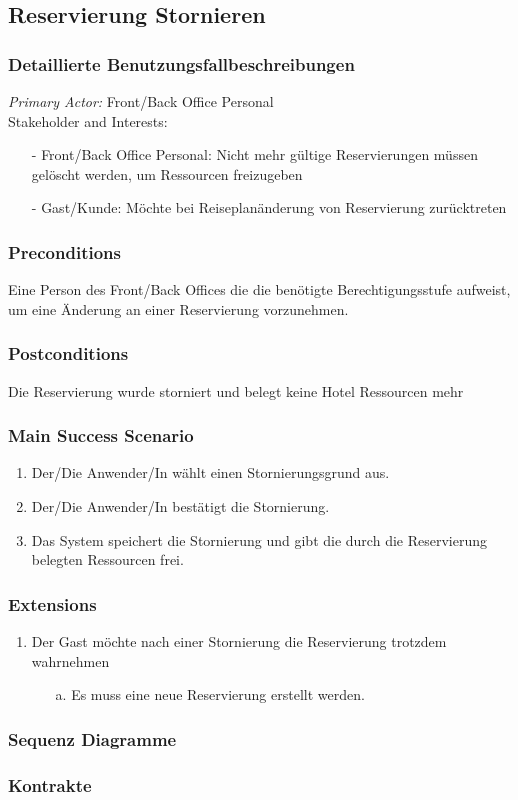 \documentclass[./detailed_overview_usecases.tex]{subfiles}
\begin{document}
    \subsection{Reservierung Stornieren}
    \subsubsection{Detaillierte Benutzungsfallbeschreibungen}
    \textit{Primary Actor:}
    Front/Back Office Personal
    \\
    Stakeholder and Interests:
    \begin{itemize}
        \item[-] Front/Back Office Personal: Nicht mehr gültige Reservierungen müssen gelöscht werden, um Ressourcen freizugeben
        \item[-] Gast/Kunde: Möchte bei Reiseplanänderung von Reservierung zurücktreten
    \end{itemize}

    \subsubsection*{Preconditions}
    Eine Person des Front/Back Offices die die benötigte Berechtigungsstufe aufweist, um eine Änderung an einer Reservierung vorzunehmen.

    \subsubsection*{Postconditions}
    Die Reservierung wurde storniert und belegt keine Hotel Ressourcen mehr

    \subsubsection*{Main Success Scenario}
    \begin{enumerate}
        \item Der/Die Anwender/In wählt einen Stornierungsgrund aus.
        \item Der/Die Anwender/In bestätigt die Stornierung.
        \item Das System speichert die Stornierung und gibt die durch die Reservierung belegten Ressourcen frei.
    \end{enumerate}

    \subsubsection*{Extensions}
    \begin{enumerate}
        \item Der Gast möchte nach einer Stornierung die Reservierung trotzdem wahrnehmen
        \begin{itemize}
            \item[a.] Es muss eine neue Reservierung erstellt werden.
        \end{itemize}
    \end{enumerate}

    \subsubsection{Sequenz Diagramme}
    \subsubsection{Kontrakte}
\end{document}
